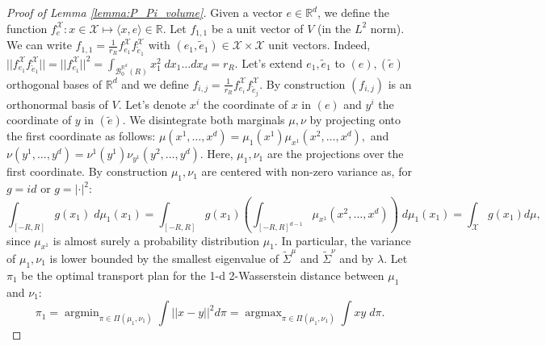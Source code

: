 \documentclass{article}
\newcommand{\R}{\mathbb{R}}
\newcommand{\X}{\mathcal{X}}
\newcommand{\1}{\mathbf{1}}
\DeclareMathOperator*{\argmax}{argmax}
\DeclareMathOperator*{\argmin}{argmin}
\theoremstyle{definition}
\theoremstyle{remark}
\begin{document}
\begin{appendices}
\begin{proof}[Proof of Lemma \ref{lemma:P_Pi_volume}]
    Given a vector $e\in\R^d$, we define the function $f^\X_e:x\in\X\mapsto \langle x,e\rangle\in \R$. Let $f_{1,1}$ be a unit vector of $V$ (in the $L^2$ norm). We can write $f_{1,1}=\frac{1}{r_R}f^\X_{e_1}f^\X_{\tilde{e}_1}$ with $(e_1,\tilde{e}_1)\in\X\times\X$ unit vectors. Indeed,  $||f^\X_{e_1}f^\X_{\tilde{e}_1}|| = ||f^\X_{e_1}||^2 = \int_{\mathcal{B}^{\R^d}_0(R)}x_1^2\; dx_1\dots dx_d=r_R$.  
    Let's extend $e_1,\tilde{e}_1$ to $(e), (\tilde{e})$ orthogonal bases of $\R^d$ and we define $f_{i,j} = \frac{1}{r_R}f^\X_{e_i}f^\X_{\tilde{e}_j}$. By construction $(f_{i,j})$ is an orthonormal basis of $V$.
    Let's denote $x^i$ the coordinate of $x$ in $(e)$ and $y^i$  the coordinate of $y$ in $(\tilde{e})$. We disintegrate both marginals $\mu,\nu$ by projecting onto the first coordinate as follows:
    $\mu(x^1,\dots,x^d)=\mu_1(x^1)\mu_{x^1}(x^2,\dots,x^d),$ and $\nu(y^1,\dots,y^d)=\nu^1(y^1)\nu_{y^1}(y^2,\dots,y^d)$.
    Here, $\mu_1,\nu_1$ are the projections over the first coordinate. By construction $\mu_1,\nu_1$ are centered with non-zero variance as, for $g=id$ or $g=|\cdot|^2$:
    \[\int_{[-R,R]} g(x_1) \;d\mu_1(x_1)=\int_{[-R,R]} g(x_1)\left(\int_{[-R,R]^{d-1}} \mu_{x^1}(x^2,\dots,x^d)\right)\;d\mu_1(x_1)=\int_\X g(x_1)d\mu,\]
    since $\mu_{x^1}$ is  almost surely a probability distribution $\mu_1$.
    In particular, the variance of $\mu_1,\nu_1$ is lower bounded by the smallest eigenvalue of $\tilde{\Sigma}^\mu$ and $\tilde{\Sigma}^\nu$ and by $\lambda$.
    Let $\pi_1$  be the optimal transport plan for the 1-d 2-Wasserstein distance between $\mu_1$ and $\nu_1$:
    \[\pi_1=\argmin_{\pi\in\Pi(\mu_1,\nu_1)}\int||x-y||^2d\pi=\argmax_{\pi\in\Pi(\mu_1,\nu_1)}\int xy\;d\pi.\]
    
   
    

\end{proof}
\end{appendices}
\end{document}
